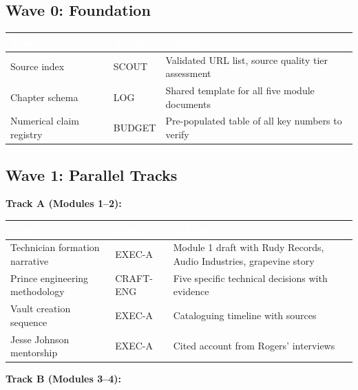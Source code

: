 \documentclass[11pt,letterpaper]{article}
\newcommand{\tableheader}[1]{\textbf{\sffamily\textcolor{white}{#1}}}
\begin{document}
\subsection{Wave 0: Foundation}

\begin{center}
\begin{tabularx}{\textwidth}{L{3cm}L{3cm}X}
\toprule
{}
\tableheader{Task} & \tableheader{Agent} & \tableheader{Output} \\
\midrule
Source index & SCOUT & Validated URL list, source quality tier assessment \\
Chapter schema & LOG & Shared template for all five module documents \\
Numerical claim registry & BUDGET & Pre-populated table of all key numbers to verify \\
\bottomrule
\end{tabularx}
\end{center}

\subsection{Wave 1: Parallel Tracks}

\textbf{Track A (Modules 1--2):}

\begin{center}
\begin{tabularx}{\textwidth}{L{4cm}L{3cm}X}
\toprule
{}
\tableheader{Task} & \tableheader{Agent} & \tableheader{Output} \\
\midrule
Technician formation narrative & EXEC-A & Module 1 draft with Rudy Records, Audio Industries, grapevine story \\
Prince engineering methodology & CRAFT-ENG & Five specific technical decisions with evidence \\
Vault creation sequence & EXEC-A & Cataloguing timeline with sources \\
Jesse Johnson mentorship & EXEC-A & Cited account from Rogers' interviews \\
\bottomrule
\end{tabularx}
\end{center}

\textbf{Track B (Modules 3--4):}
\end{document}
